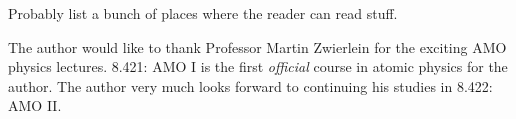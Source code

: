 \documentclass[reprint,
nofootinbib,
amsmath,amssymb,
aps]{revtex4-1}
\begin{document}
Probably list a bunch of places where the reader can read stuff. 



\begin{acknowledgments}
	The author would like to thank Professor Martin Zwierlein for the exciting AMO physics lectures. 8.421: AMO I is the first \textit{official} course in atomic physics for the author. The author very much looks forward to continuing his studies in 8.422: AMO II. 
\end{acknowledgments}



\end{document}
